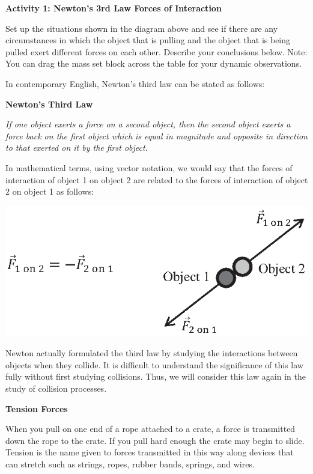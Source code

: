 \textbf{Activity 1: Newton's 3rd Law Forces of Interaction }

Set up the situations shown in the diagram above and see if there are any circumstances
in which the object that is pulling and the object that is being pulled exert
different forces on each other. Describe your conclusions below. Note: You can
drag the mass set block across the table for your dynamic observations.
\answerspace{20mm}

\pagebreak[2]
In contemporary English, Newton's third law can be stated as follows:

\textbf{Newton's Third Law }

\textit{If one object exerts a force on a second object, then the second object
exerts a force back on the first object which is equal in magnitude and opposite
in direction to that exerted on it by the first object.}

In mathematical terms, using vector notation, we would say that the forces of
interaction of object 1 on object 2 are related to the forces of interaction
of object 2 on object 1 as follows:

\vspace{0.3cm}
{\par\centering \includegraphics{newton/newton_fig2_new.eps} \par}
\vspace{0.3cm}

Newton actually formulated the third law by studying the interactions between
objects when they collide. It is difficult to understand the significance of
this law fully without first studying collisions. Thus, we will consider this
law again in the study of collision processes.

\bigskip
\textbf{Tension Forces }

When you pull on one end of a rope attached to a crate, a force is transmitted
down the rope to the crate. If you pull hard enough the crate may begin to slide.
Tension is the name given to forces transmitted in this way along devices that
can stretch such as strings, ropes, rubber bands, springs, and wires.

